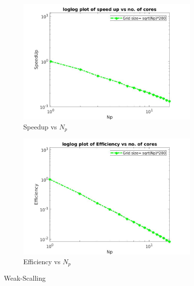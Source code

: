 \documentclass{article}
\begin{document}
\begin{figure}
    \bigskip
    \begin{subfigure}{\textwidth}
    \centering
    \includegraphics[scale=0.33]{Speedupweak.jpeg}
    \caption{Speedup vs $N_p$}
    \label{fig:doc2}
    \end{subfigure}
    \bigskip
    \begin{subfigure}{\textwidth}
    \centering
    \includegraphics[scale=0.33]{Efficiencyweak.jpeg}
    \caption{Efficiency vs $N_p$}
    \label{fig:doc3}
    \end{subfigure}
    
\caption{Weak-Scalling}
\end{figure}
\end{document}
